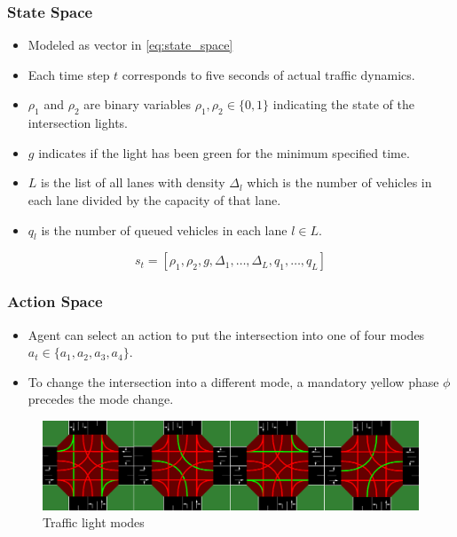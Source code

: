 \documentclass[compress,12pt]{beamer}
\begin{document}
\begin{frame}[bg=arguelles.png]
      \frametitle{State Space}
      \begin{itemize}
      \item Modeled as vector in \ref{eq:state_space}
      \item Each time step \(t\) corresponds to five seconds of actual traffic dynamics.
      \item \(\rho_1\) and \(\rho_2\) are binary variables \(\rho_1, \rho_2 \in \{0, 1\}\) indicating the state of the intersection lights.
      \item \(g\) indicates if the light has been green for the minimum specified time.
      \item \(L\) is the list of all lanes with density \(\Delta_l\) which is the number of vehicles in each lane divided by the capacity of that lane.
      \item \(q_l\) is the number of queued vehicles in each lane \(l \in L\).
      \end{itemize}

\begin{equation}
s_t = [\rho_1, \rho_2, g, \Delta_1, \ldots, \Delta_L, q_1, \ldots, q_L]
\label{eq:state_space}
\end{equation}

\end{frame}

\begin{frame}[bg=arguelles.png]
      \frametitle{Action Space}
      \begin{itemize}
      \item Agent can select an action to put the intersection into one of four modes \(a_t \in \{a_1, a_2, a_3, a_4\}\).
      \item To change the intersection into a different mode, a mandatory yellow phase $\phi$ precedes the mode change.
      \end{itemize}

    \begin{figure}[htbp]
      \centering
      \includegraphics[width=0.8\linewidth]{actions.png}
      \caption{Traffic light modes}
      \label{fig:action_space}
    \end{figure}
\end{frame}
\end{document}
